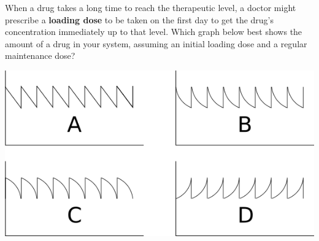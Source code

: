 \documentclass{ximera}
\begin{document}
\begin{question}
When a drug takes a long time to reach the therapeutic level, a doctor
might prescribe a \textbf{loading dose} to be taken on the first day
to get the drug's concentration immediately up to that level. Which
graph below best shows the amount of a drug in your system, assuming
an initial loading dose and a regular maintenance dose?
\begin{image}
  \includegraphics{plots.png}
\end{image}
\begin{multipleChoice}
\end{multipleChoice}
\end{question}



\end{document}
